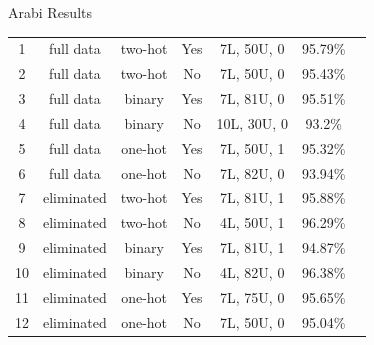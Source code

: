 \documentclass[10pt]{beamer}
\begin{document}
\begin{frame}[fragile]{Arabi Results}
\begin{center}
\begin{tabular}{c c c c c c c}
   \small{1} & \small{full data} & \small{two-hot} & \small{Yes} & \small{7L, 50U, 0} &\small{95.79\%}\\ 
   \small{2} & \small{full data} & \small{two-hot} & \small{No} & \small{7L, 50U, 0} & \small{95.43\%}\\ 
   \small{3} & \small{full data} & \small{binary} & \small{Yes} & \small{7L, 81U, 0} & \small{95.51\%}\\ 
   \small{4} & \small{full data} & \small{binary} & \small{No} & \small{10L, 30U, 0} & \small{93.2\%}\\ 
   \small{5} & \small{full data} & \small{one-hot} & \small{Yes} & \small{7L, 50U, 1} & \small{95.32\%}\\ 
   \small{6} & \small{full data} & \small{one-hot} & \small{No}  &\small{7L, 82U, 0} & \small{93.94\%}\\ 
   \small{7} & \small{eliminated} & \small{two-hot} & \small{Yes} & \small{7L, 81U, 1} & \small{95.88\%}\\
   \small{8} & \small{eliminated} & \small{two-hot} & \small{No}  &\small{4L, 50U, 1} & \small{96.29\%}\\ 
   \small{9} & \small{eliminated} & \small{binary} & \small{Yes} & \small{7L, 81U, 1} & \small{94.87\%}\\ 
   \small{10} & \small{eliminated} & \small{binary} & \small{No} & \small{4L, 82U, 0} & \small{96.38\%}\\ 
   \small{11} & \small{eliminated} & \small{one-hot} & \small{Yes} & \small{7L, 75U, 0} & \small{95.65\%}\\ 
   \small{12} & \small{eliminated} & \small{one-hot} & \small{No} & \small{7L, 50U, 0} & \small{95.04\%}\\ 



\end{tabular}
\end{center}
\end{frame}
\end{document}
